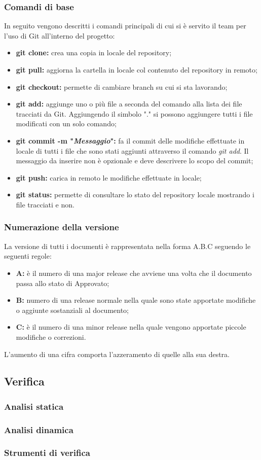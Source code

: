		\subsubsection{Comandi di base}
			In seguito vengono descritti i comandi principali di cui si è servito il team per l'uso di Git all'interno del progetto:
			\begin{itemize}
				\item \textbf{git clone:} crea una copia in locale del repository;
				\item \textbf{git pull:} aggiorna la cartella in locale col contenuto del repository in remoto;
				\item \textbf{git checkout:} permette di cambiare branch su cui si sta lavorando;
				\item \textbf{git add:} aggiunge uno o più file a seconda del comando alla lista dei file tracciati da Git. Aggiungendo il simbolo "." si possono aggiungere tutti i file modificati con un solo comando;
				\item \textbf{git commit -m "\textit{Messaggio}":} fa il commit delle modifiche effettuate in locale di tutti i file che sono stati aggiunti attraverso il comando \textit{git add}. Il messaggio da inserire non è opzionale e deve descrivere lo scopo del commit;
				\item \textbf{git push:} carica in remoto le modifiche effettuate in locale;
				\item \textbf{git status:} permette di consultare  lo stato del repository locale mostrando i file tracciati e non.
			\end{itemize}
		\subsubsection{Numerazione della versione}
		\label{3.2.2}
			La versione di tutti i documenti è rappresentata nella forma A.B.C seguendo le seguenti regole:
			\begin{itemize}
				\item \textbf{A:} è il numero di una major release che avviene una volta che il documento passa allo stato di Approvato;
				\item \textbf{B:} numero di una release normale nella quale sono state apportate modifiche o aggiunte sostanziali al documento;
				\item \textbf{C:} è il numero di una minor release nella quale vengono apportate piccole modifiche o correzioni.
			\end{itemize}
		L'aumento di una cifra comporta l'azzeramento di quelle alla sua destra. \newline
	\subsection{Verifica}
		\subsubsection{Analisi statica}

		\subsubsection{Analisi dinamica}

		\subsubsection{Strumenti di verifica}